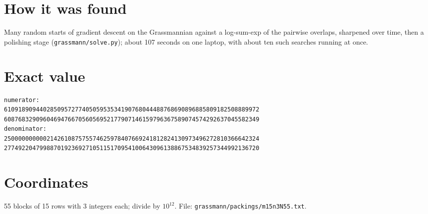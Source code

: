 \documentclass[11pt,a4paper]{article}
\begin{document}
\section{How it was found}
Many random starts of gradient descent on the Grassmannian against a log-sum-exp of the pairwise overlaps, sharpened over time, then a polishing stage (\texttt{grassmann/solve.py}); about 107 seconds on one laptop, with about ten such searches running at once.


\appendix
\section{Exact value}
{\small
\begin{verbatim}
numerator:
610918909440285095727740505953534190768044488768690896885809182508889972
608768329096046947667056056952177907146159796367589074574292637045582349
denominator:
250000000000214261087575574625978407669241812824130973496272810366642324
277492204799887019236927105115170954100643096138867534839257344992136720
\end{verbatim}}

\section{Coordinates}
55 blocks of 15 rows with 3 integers each; divide by $10^{12}$. File: \texttt{grassmann/packings/m15n3N55.txt}.
{\tiny
\begin{multicols}{3}
\end{multicols}}
\end{document}
